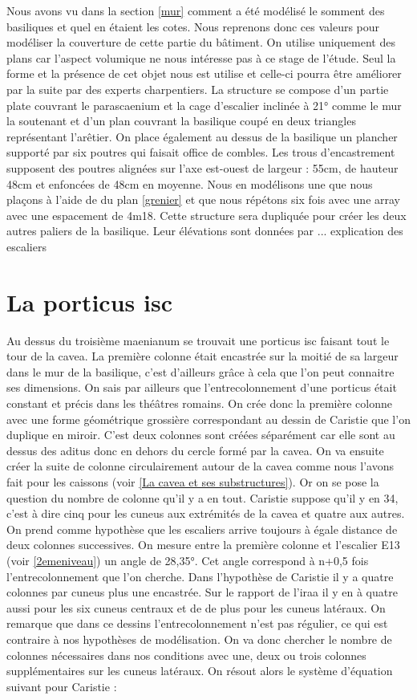 Nous avons vu dans la section \ref{mur} comment a été modélisé le somment des basiliques et quel en étaient les cotes. Nous reprenons donc ces valeurs pour modéliser la couverture de cette partie du bâtiment. On utilise uniquement des plans car l'aspect volumique ne nous intéresse pas à ce stage de l'étude. Seul la forme et la présence de cet objet nous est utilise et celle-ci pourra être améliorer par la suite par des experts charpentiers. La structure se compose d'un partie plate couvrant le parascaenium et la cage d'escalier inclinée à 21° comme le mur la soutenant et d'un plan couvrant la basilique coupé en deux triangles représentant l'arêtier. On place également au dessus de la basilique un plancher supporté par six poutres qui faisait office de combles. Les trous d'encastrement supposent des poutres alignées sur l'axe est-ouest de largeur : 55cm, de hauteur 48cm et enfoncées de 48cm en moyenne. Nous en modélisons une que nous plaçons à l'aide de du plan \ref{grenier} et que nous répétons six fois avec une \gls{array} avec une espacement de 4m18. Cette structure sera dupliquée pour créer les deux autres paliers de la basilique. Leur élévations sont données par ... explication des escaliers

\section{La \gls{porticus isc}}
Au dessus du troisième maenianum se trouvait une \gls{porticus isc} faisant tout le tour de la cavea. La première colonne était encastrée sur la moitié de sa largeur dans le mur de la basilique, c'est d'ailleurs grâce à cela que l'on peut connaitre ses dimensions. On sais par ailleurs que l'entrecolonnement d'une porticus était constant et précis dans les théâtres romains. On crée donc la première colonne avec une forme géométrique grossière correspondant au dessin de Caristie que l'on duplique en miroir. C'est deux colonnes sont créées séparément car elle sont au dessus des aditus donc en dehors du cercle formé par la cavea. On va ensuite créer la suite de colonne circulairement autour de la cavea comme nous l'avons fait pour les caissons (voir \ref{La cavea et ses substructures}). Or on se pose la question du nombre de colonne qu'il y a en tout. Caristie suppose qu'il y en 34, c'est à dire cinq pour les \gls{cuneus} aux extrémités de la cavea et quatre aux autres. On prend comme hypothèse que les escaliers arrive toujours à égale distance de deux colonnes successives. On mesure entre la première colonne et l'escalier E13 (voir \ref{2emeniveau}) un angle de 28,35°. Cet angle correspond à n+0,5 fois l'entrecolonnement que l'on cherche. Dans l'hypothèse de Caristie il y a quatre colonnes par cuneus plus une encastrée. Sur le rapport de l'\gls{iraa} \cite[Pl. XX]{orangePl} il y en à quatre aussi pour les six cuneus centraux et de de plus pour les cuneus latéraux. On remarque que dans ce dessins l'entrecolonnement n'est pas régulier, ce qui est contraire à nos hypothèses de modélisation. On va donc chercher le nombre de colonnes nécessaires dans nos conditions avec une, deux ou trois colonnes supplémentaires sur les cuneus latéraux. On résout alors le système d'équation suivant pour Caristie :


